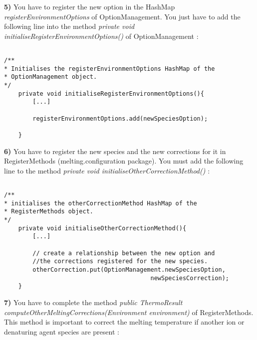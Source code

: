 \documentclass{article}
\begin{document}
\textbf{5)} You have to register the new option in the HashMap \textit{registerEnvironmentOptions}
of OptionManagement. You just have to add the following line into the method 
\textit{private void initialiseRegisterEnvironmentOptions()} of OptionManagement :

\begin{verbatim}

/**
* Initialises the registerEnvironmentOptions HashMap of the 
* OptionManagement object.
*/
	private void initialiseRegisterEnvironmentOptions(){
		[...]
		
		registerEnvironmentOptions.add(newSpeciesOption);

	}

\end{verbatim}

\textbf{6)} You have to register the new species and the new corrections for it in RegisterMethods (melting.configuration package).
You must add the following line to the method \textit{private void initialiseOtherCorrectionMethod()} :

\begin{verbatim}

/**
* initialises the otherCorrectionMethod HashMap of the 
* RegisterMethods object.
*/
	private void initialiseOtherCorrectionMethod(){
		[...]
		
		// create a relationship between the new option and 
		//the corrections registered for the new species.
		otherCorrection.put(OptionManagement.newSpeciesOption, 
		                                 newSpeciesCorrection);
	}

\end{verbatim}


\textbf{7)} You have to complete the method \textit{public ThermoResult computeOtherMeltingCorrections(Environment environment)}
of RegisterMethods. This method is important to correct the melting temperature if another ion or denaturing agent species
are present :
\end{document}
